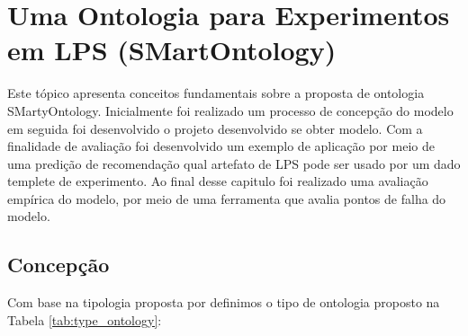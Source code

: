 \chapter{Uma Ontologia para Experimentos em LPS (SMartOntology)}
\label{sec:ontologia}

Este tópico apresenta conceitos fundamentais sobre a proposta de ontologia SMartyOntology. Inicialmente foi realizado um processo de concepção do modelo em seguida foi desenvolvido o projeto desenvolvido se obter modelo. Com a finalidade de avaliação foi desenvolvido um exemplo de aplicação por meio de uma predição de recomendação qual artefato de LPS pode ser usado por um dado templete de experimento. Ao final desse capitulo foi realizado uma avaliação empírica do modelo, por meio de uma ferramenta que avalia pontos de falha do modelo.

\section{Concepção}
\label{sec:concepcao}

Com base na tipologia proposta por \cite{almeida2003visao} definimos o tipo de ontologia proposto na Tabela \ref{tab:type_ontology}:

